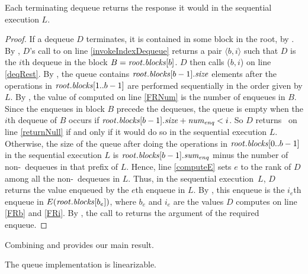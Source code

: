 \begin{lemma}\label{linearCorrect}
Each terminating dequeue returns the response it would in the sequential execution $L$.
\end{lemma}
\begin{proof}
If a dequeue $D$ terminates, it is contained in some block in the root, by .
By , $D$'s call to  on line \ref{invokeIndexDequeue}
returns a pair $\langle b,i\rangle$ such that $D$ is the $i$th dequeue in the block 
$B=\mbox{\textnormal{\textit{root}}}.\mbox{\textit{blocks}}[b]$.
$D$ then calls ($b,i$) on line \ref{deqRest}.
By , the queue contains $\mbox{\textnormal{\textit{root}}}.\mbox{\textit{blocks}}[b-1].\mbox{\textit{size}}$ elements
after the operations in $\mbox{\textnormal{\textit{root}}}.\mbox{\textit{blocks}}[1..b-1]$ are performed sequentially 
in the order given by $L$.
By , the value of  computed on line \ref{FRNum}
is the number of enqueues in $B$.
Since the enqueues in block $B$ precede the dequeues,
the queue is empty when the $i$th dequeue of $B$ occurs if 
$\mbox{\textnormal{\textit{root}}}.\mbox{\textit{blocks}}[b-1].\mbox{\textit{size}} + \mbox{\textnormal{\textit{num\textsubscript{enq}}}} < i$.
So $D$ returns \nl\ on line \ref{returnNull} if and only if it would do so in the sequential
execution $L$.
Otherwise, the size of the queue after doing the operations in $\mbox{\textnormal{\textit{root}}}.\mbox{\textit{blocks}}[0..b-1]$
in the sequential execution $L$ is $\mbox{\textnormal{\textit{root}}}.\mbox{\textit{blocks}}[b-1].\mbox{\textit{sum\textsubscript{enq}}}$ minus
the number of non-\nl\ dequeues in that prefix of $L$.
Hence, line \ref{computeE} sets $e$ to the rank of $D$ among all the non-\nl\ dequeues in $L$.
Thus, in the sequential execution~$L$, $D$ returns the value enqueued by the $e$th enqueue in $L$.
By , this enqueue is the $i_e$th enqueue 
in $E(\mbox{\textnormal{\textit{root}}}.\mbox{\textit{blocks}}[b_e])$, where
$b_e$ and $i_e$ are the values $D$ computes on line \ref{FRb} and \ref{FRi}.
By , the call to  returns the argument of the required enqueue.
\end{proof}

Combining  and  provides our main result.

\begin{mytheorem}
The queue implementation is linearizable.
\end{mytheorem}


